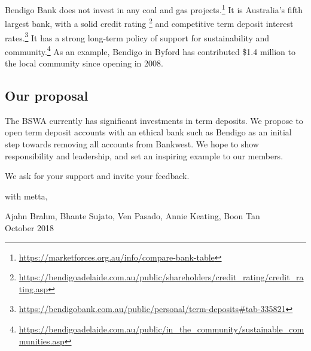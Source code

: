 \documentclass[11pt]{article}
\begin{document}
Bendigo Bank does not invest in any coal and gas projects.\footnote{\url{https://marketforces.org.au/info/compare-bank-table}} It is Australia’s fifth largest bank, with a solid credit rating \footnote{\url{https://bendigoadelaide.com.au/public/shareholders/credit\_rating/credit\_rating.asp}} and competitive term deposit interest rates.\footnote{\url{https://bendigobank.com.au/public/personal/term-deposits\#tab-335821}} It has a strong long-term policy of support for sustainability and community.\footnote{\url{https://bendigoadelaide.com.au/public/in\_the\_community/sustainable\_communities.asp}} As an example, Bendigo in Byford has contributed \$1.4 million to the local community since opening in 2008.

\subsection*{Our proposal}

The BSWA currently has significant investments in term deposits. We propose to open term deposit accounts with an ethical bank such as Bendigo as an initial step towards removing all accounts from Bankwest. We hope to show responsibility and leadership, and set an inspiring example to our members.

We ask for your support and invite your feedback.

\medskip

\noindent with metta,

\medskip

\noindent Ajahn Brahm, Bhante Sujato, Ven Pasado, Annie Keating, Boon Tan\\
\noindent October 2018
\end{document}
